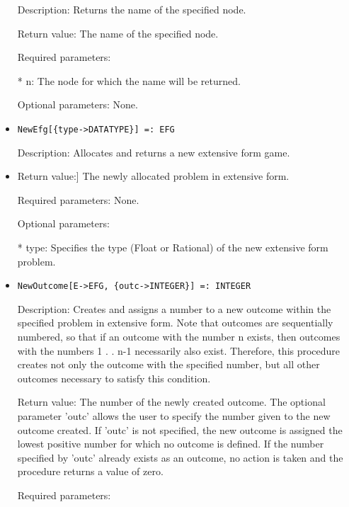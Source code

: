\begin{itemize}
\bd
\item
[Description:] Returns the name of the specified node.
\item
[Return value:] The name of the specified node.
\item
[Required parameters:]\hfil\null

\bd
\item
[* n:] The node for which the name will be returned.
\ed

\item
[Optional parameters:] None.
\ed

\item
\begin{verbatim}
NewEfg[{type->DATATYPE}] =: EFG
\end{verbatim}

\bd
\item
[Description:] Allocates and returns a new extensive form game.
\item
 Return value:] The newly allocated problem in extensive form.
\item
[Required parameters:] None.
\item
[Optional parameters:]\hfil\null

\bd
\item
[* type:] Specifies the type (Float or Rational) of the new extensive
form problem.
\ed
\ed

\item
\begin{verbatim}
NewOutcome[E->EFG, {outc->INTEGER}] =: INTEGER
\end{verbatim}

\bd
\item
[Description:] Creates and assigns a number to a new outcome within the
specified problem in extensive form.  Note that outcomes are 
sequentially numbered, so that if an outcome with the number n exists,
then outcomes with the numbers 1 . . n-1 necessarily also exist.
Therefore, this procedure creates not only the outcome with the 
specified number, but all other outcomes necessary to satisfy this 
condition.
\item
[Return value:] The number of the newly created outcome.  The optional 
parameter 'outc' allows the user to specify the number given to the new
outcome created.  If 'outc' is not specified, the new outcome is 
assigned the lowest positive number for which no outcome is defined.  
If the number specified by 'outc' already exists as an outcome, no 
action is taken and the procedure returns a value of zero.
\item
[Required parameters:]\hfil\null


\end{itemize}
